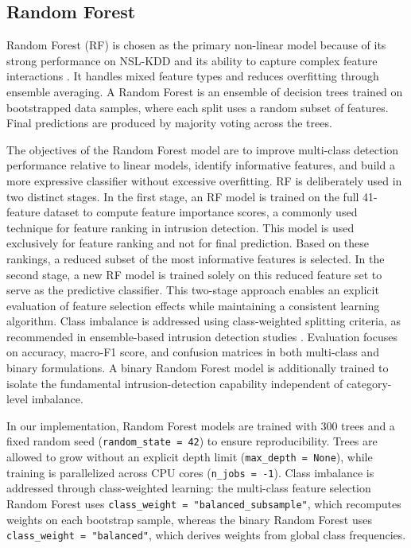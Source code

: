 \subsection{Random Forest}
Random Forest (RF) is chosen as the primary non-linear model because of its strong performance on NSL-KDD and its ability to capture complex feature interactions \cite{abrar2020machine, hegde2024intrusion, hong2021machine}. It handles mixed feature types and reduces overfitting through ensemble averaging. A Random Forest is an ensemble of decision trees trained on bootstrapped data samples, where each split uses a random subset of features. Final predictions are produced by majority voting across the trees. 



The objectives of the Random Forest model are to improve multi-class detection performance relative to linear models, identify informative features, and build a more 
expressive classifier without excessive overfitting. RF is deliberately used in two distinct stages. In the first stage, an RF model is trained on the full 41-feature 
dataset to compute feature importance scores, a commonly used technique for feature ranking in intrusion detection. 
This model is used exclusively for feature ranking and not for final prediction. Based on these rankings, a reduced subset of the most informative features is selected. 
In the second stage, a new RF model is trained solely on this reduced feature set to serve as the predictive classifier. This two-stage approach enables an explicit evaluation of 
feature selection effects while maintaining a consistent learning algorithm. Class imbalance is addressed using class-weighted splitting criteria, as recommended in ensemble-based 
intrusion detection studies \cite{abrar2020machine, hong2021machine}. Evaluation focuses on accuracy, macro-F1 score, and confusion matrices in both multi-class and binary formulations.
 A binary Random Forest model is additionally trained to isolate the fundamental intrusion-detection capability independent of category-level imbalance.

In our implementation, Random Forest models are trained with 300 trees and a fixed random seed (\texttt{random\_state = 42}) to ensure reproducibility. 
Trees are allowed to grow without an explicit depth limit (\texttt{max\_depth = None}), while training is parallelized across CPU cores (\texttt{n\_jobs = -1}). 
Class imbalance is addressed through class-weighted learning: the multi-class feature selection Random Forest uses \texttt{class\_weight = "balanced\_subsample"}, 
which recomputes weights on each bootstrap sample, whereas the binary Random Forest uses \texttt{class\_weight = "balanced"}, which derives weights from global class frequencies.

